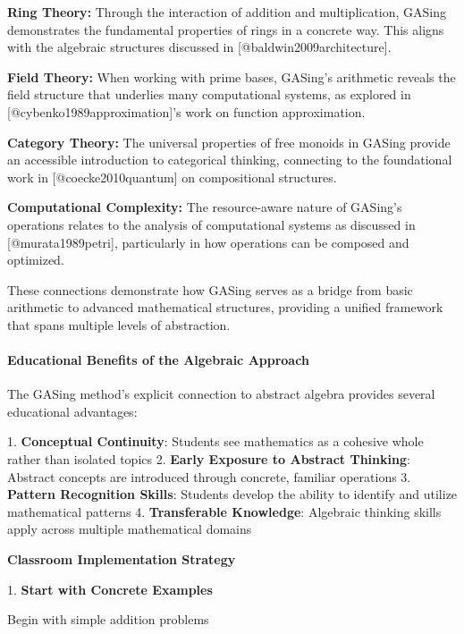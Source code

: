 \noindent\textbf{\textbf{Ring Theory}:} Through the interaction of addition and multiplication, GASing demonstrates the fundamental properties of rings in a concrete way. This aligns with the algebraic structures discussed in [@baldwin2009architecture].



\noindent\textbf{\textbf{Field Theory}:} When working with prime bases, GASing's arithmetic reveals the field structure that underlies many computational systems, as explored in [@cybenko1989approximation]'s work on function approximation.



\noindent\textbf{\textbf{Category Theory}:} The universal properties of free monoids in GASing provide an accessible introduction to categorical thinking, connecting to the foundational work in [@coecke2010quantum] on compositional structures.



\noindent\textbf{\textbf{Computational Complexity}:} The resource-aware nature of GASing's operations relates to the analysis of computational systems as discussed in [@murata1989petri], particularly in how operations can be composed and optimized.


These connections demonstrate how GASing serves as a bridge from basic arithmetic to advanced mathematical structures, providing a unified framework that spans multiple levels of abstraction.
\paragraph{Educational Benefits of the Algebraic Approach}

The GASing method's explicit connection to abstract algebra provides several educational advantages:

1. \textbf{Conceptual Continuity}: Students see mathematics as a cohesive whole rather than isolated topics
2. \textbf{Early Exposure to Abstract Thinking}: Abstract concepts are introduced through concrete, familiar operations
3. \textbf{Pattern Recognition Skills}: Students develop the ability to identify and utilize mathematical patterns
4. \textbf{Transferable Knowledge}: Algebraic thinking skills apply across multiple mathematical domains

\textbf{Classroom Implementation Strategy}

1. \textbf{Start with Concrete Examples}

\noindent Begin with simple addition problems



